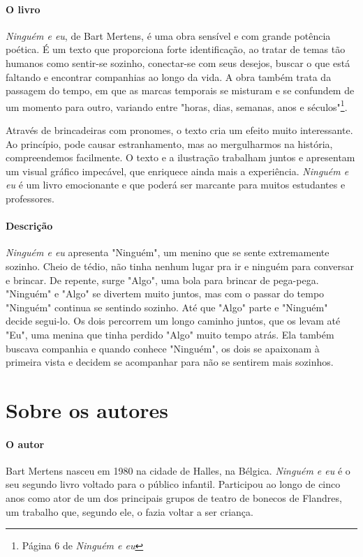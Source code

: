 \documentclass[11pt]{extarticle}
\begin{document}
\paragraph{O livro} \textit{Ninguém e eu}, de Bart Mertens, é uma obra sensível e com grande potência poética. É um texto que 
proporciona forte identificação, ao tratar de temas tão humanos como sentir-se sozinho, conectar-se com seus desejos, buscar o que está faltando e encontrar companhias ao longo da vida. A obra também trata da passagem do tempo, em que as marcas temporais se misturam e se confundem de um momento para outro, variando entre "horas, dias, semanas, anos e séculos"\footnote{Página 6 de \textit{Ninguém e eu}}.

Através de brincadeiras com pronomes, o texto cria um efeito muito interessante. Ao princípio, pode causar estranhamento, mas ao mergulharmos na história, compreendemos facilmente. O texto e a ilustração trabalham juntos e apresentam um visual gráfico impecável, que enriquece ainda mais a experiência. \textit{Ninguém e eu} é um livro emocionante e que poderá ser marcante para muitos estudantes e professores.

\paragraph{Descrição} \textit{Ninguém e eu} apresenta "Ninguém", um menino que se sente extremamente sozinho. Cheio de tédio, não tinha nenhum lugar pra ir e ninguém para conversar e brincar. De repente, surge "Algo", uma bola para brincar de pega-pega. "Ninguém" e "Algo" se divertem muito juntos, mas com o passar do tempo "Ninguém" continua se sentindo sozinho. Até que "Algo" parte e "Ninguém" decide segui-lo. Os dois percorrem um longo caminho juntos, que os levam até "Eu", uma menina que tinha perdido "Algo" muito tempo atrás. Ela também buscava companhia e quando conhece "Ninguém", os dois se apaixonam à primeira vista e decidem se acompanhar para não se sentirem mais sozinhos.

\section{Sobre os autores}

\paragraph{O autor} Bart Mertens nasceu em 1980 na cidade de Halles, na Bélgica. \textit{Ninguém e eu} é o seu segundo livro voltado para o público infantil. Participou ao longo de cinco anos como ator de um dos principais grupos de teatro de bonecos de Flandres, um trabalho que, segundo ele, o fazia voltar a ser criança. 
\end{document}
